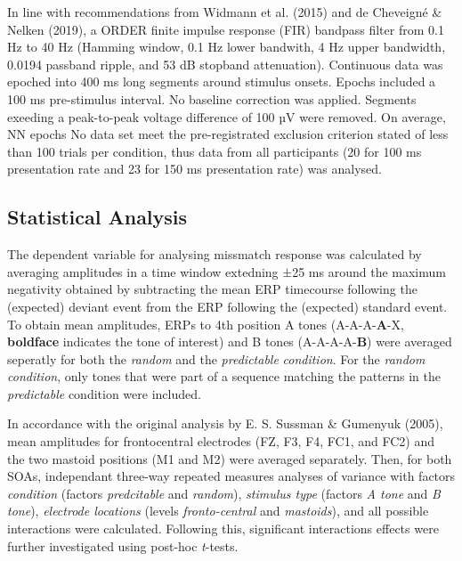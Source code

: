 \documentclass[stu,a4paper,12pt, nofontenc, babel, american]{apa7}
\begin{document}
In line with recommendations from Widmann et al. (2015) and de Cheveigné
\& Nelken (2019), a ORDER finite impulse response (FIR) bandpass filter
from 0.1 Hz to 40 Hz (Hamming window, 0.1 Hz lower bandwith, 4 Hz upper
bandwidth, 0.0194 passband ripple, and 53 dB stopband attenuation).
Continuous data was epoched into 400 ms long segments around stimulus
onsets. Epochs included a 100 ms pre-stimulus interval. No baseline
correction was applied. Segments exeeding a peak-to-peak voltage
difference of 100 µV were removed. On average, NN epochs No data set
meet the pre-registrated exclusion criterion stated of less than 100
trials per condition, thus data from all participants (20 for 100 ms
presentation rate and 23 for 150 ms presentation rate) was analysed.

\hypertarget{statistical-analysis}{%
\subsection{Statistical Analysis}\label{statistical-analysis}}

The dependent variable for analysing missmatch response was calculated
by averaging amplitudes in a time window extedning ±25 ms around the
maximum negativity obtained by subtracting the mean ERP timecourse
following the (expected) deviant event from the ERP following the
(expected) standard event. To obtain mean amplitudes, ERPs to 4th
position A tones (A-A-A-\textbf{A}-X, \textbf{boldface} indicates the
tone of interest) and B tones (A-A-A-A-\textbf{B}) were averaged
seperatly for both the \emph{random} and the \emph{predictable}
\emph{condition}. For the \emph{random condition}, only tones that were
part of a sequence matching the patterns in the \emph{predictable}
condition were included.

In accordance with the original analysis by E. S. Sussman \& Gumenyuk
(2005), mean amplitudes for frontocentral electrodes (FZ, F3, F4, FC1,
and FC2) and the two mastoid positions (M1 and M2) were averaged
separately. Then, for both SOAs, independant three-way repeated measures
analyses of variance with factors \emph{condition} (factors
\emph{predcitable} and \emph{random}), \emph{stimulus type} (factors
\emph{A tone} and \emph{B tone}), \emph{electrode locations} (levels
\emph{fronto-central} and \emph{mastoids}), and all possible
interactions were calculated. Following this, significant interactions
effects were further investigated using post-hoc \emph{t}-tests.
\end{document}
